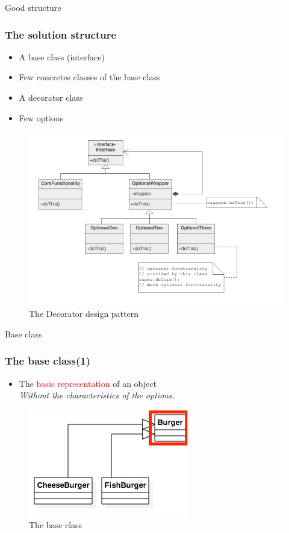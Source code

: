 \documentclass{beamer}
\begin{document}
  \begin{frame}{Good structure}
    \frametitle{The solution structure}
    \begin{itemize}
      \item A base class (interface)
      \item Few concretes classes of the base class
      \item A decorator class
      \item Few options
    \end{itemize}
    \begin{figure}[!b]
      \centering
      \includegraphics[scale=0.27]{good}
      \caption{The Decorator design pattern}
    \end{figure}
  \end{frame}

  \begin{frame}{Base class}
    \frametitle{The base class(1)}
    \begin{itemize}
      \item The \textcolor{red}{basic representation} of an object \\
      \textit{Without the characteristics of the options.}
    \end{itemize}
    \begin{figure}[!b]
      \centering
      \includegraphics[scale=0.4]{Base}
      \caption{The base class}
    \end{figure}
  \end{frame}
\end{document}
